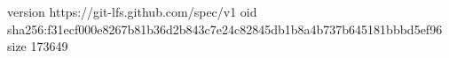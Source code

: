 version https://git-lfs.github.com/spec/v1
oid sha256:f31ecf000e8267b81b36d2b843c7e24c82845db1b8a4b737b645181bbbd5ef96
size 173649
